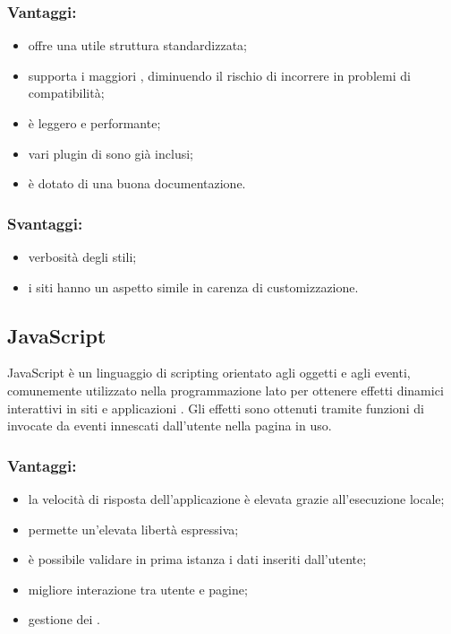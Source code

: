\documentclass[a4paper, titlepage]{article}
\begin{document}
\subsubsection{Vantaggi:}

\begin{itemize}
	\item offre una utile struttura standardizzata;
	\item supporta i maggiori , diminuendo il rischio di incorrere in problemi di compatibilità;
	\item è leggero e performante;
	\item vari plugin di  sono già inclusi;
	\item è dotato di una buona documentazione.
\end{itemize}

\subsubsection{Svantaggi:}

\begin{itemize}
	\item verbosità degli stili;
	\item i siti hanno un aspetto simile in carenza di customizzazione.
\end{itemize}

\subsection{JavaScript}
JavaScript è un linguaggio di scripting orientato agli oggetti e agli eventi, comunemente utilizzato nella programmazione  lato  per ottenere effetti dinamici interattivi in siti e applicazioni . Gli effetti sono ottenuti tramite funzioni di  invocate da eventi innescati dall'utente nella pagina  in uso.

\subsubsection{Vantaggi:}

\begin{itemize}
	\item la velocità di risposta dell'applicazione è elevata grazie all'esecuzione locale;
	\item {} permette un'elevata libertà espressiva;
	\item è possibile validare in prima istanza i dati inseriti dall'utente;
	\item migliore interazione tra utente e pagine;
	\item gestione dei .
\end{itemize}
\end{document}
